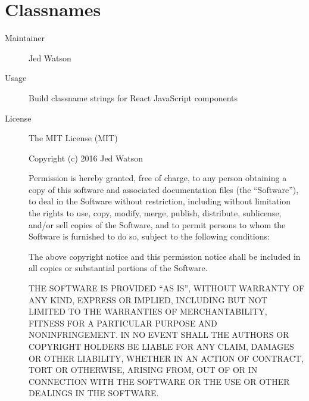   \section*{Classnames}
    \begin{description}
      \item[Maintainer] Jed Watson
      \item[Usage] Build classname strings for React JavaScript components
      \item[License] \scriptsize The MIT License (MIT)

        Copyright (c) 2016 Jed Watson

        Permission is hereby granted, free of charge, to any person obtaining a copy
        of this software and associated documentation files (the ``Software''), to deal
        in the Software without restriction, including without limitation the rights
        to use, copy, modify, merge, publish, distribute, sublicense, and/or sell
        copies of the Software, and to permit persons to whom the Software is
        furnished to do so, subject to the following conditions:

        The above copyright notice and this permission notice shall be included in all
        copies or substantial portions of the Software.

        THE SOFTWARE IS PROVIDED ``AS IS'', WITHOUT WARRANTY OF ANY KIND, EXPRESS OR
        IMPLIED, INCLUDING BUT NOT LIMITED TO THE WARRANTIES OF MERCHANTABILITY,
        FITNESS FOR A PARTICULAR PURPOSE AND NONINFRINGEMENT. IN NO EVENT SHALL THE
        AUTHORS OR COPYRIGHT HOLDERS BE LIABLE FOR ANY CLAIM, DAMAGES OR OTHER
        LIABILITY, WHETHER IN AN ACTION OF CONTRACT, TORT OR OTHERWISE, ARISING FROM,
        OUT OF OR IN CONNECTION WITH THE SOFTWARE OR THE USE OR OTHER DEALINGS IN THE
        SOFTWARE.
    \end{description}


